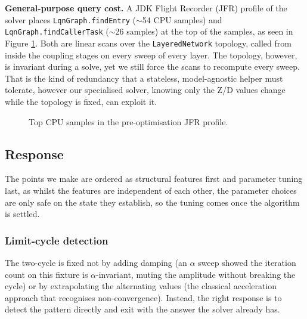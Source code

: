 \textbf{General-purpose query cost.} A JDK Flight Recorder (JFR) profile of the solver places \texttt{LqnGraph.findEntry} ($\sim$54 CPU samples) and \texttt{LqnGraph.findCallerTask} ($\sim$26 samples) at the top of the samples, as seen in Figure \ref{fig:DRAFT-jfr-profile}. Both are linear scans over the \texttt{LayeredNetwork} topology, called from inside the coupling stages on every sweep of every layer. The topology, however, is invariant during a solve, yet we still force the scans to recompute every sweep. That is the kind of redundancy that a stateless, model-agnostic helper must tolerate, however our specialised solver, knowing only the Z/D values change while the topology is fixed, can exploit it.

\begin{figure}[!ht]\centering
{}
\caption{Top CPU samples in the pre-optimisation JFR profile.}
\label{fig:DRAFT-jfr-profile}
\end{figure}

\subsection{Response}

The points we make are ordered as structural features first and parameter tuning last, as whilst the features are independent of each other, the parameter choices are only safe on the state they establish, so the tuning comes once the algorithm is settled.

\subsubsection*{Limit-cycle detection}

The two-cycle is fixed not by adding damping (an $\alpha$ sweep showed the iteration count on this fixture is $\alpha$-invariant, muting the amplitude without breaking the cycle) or by extrapolating the alternating values (the classical acceleration approach that recognises non-convergence). Instead, the right response is to detect the pattern directly and exit with the answer the solver already has. 

